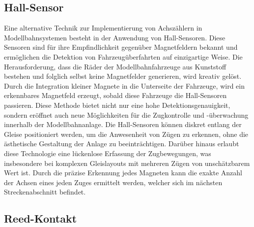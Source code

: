 \subsection{Hall-Sensor}\label{text:Methodik:Achszähler:Hall-Sensor}

Eine alternative Technik zur Implementierung von Achszählern in Modellbahnsystemen besteht in der Anwendung von Hall-Sensoren. Diese Sensoren sind für ihre Empfindlichkeit gegenüber Magnetfeldern bekannt und ermöglichen die Detektion von Fahrzeugüberfahrten auf einzigartige Weise. Die Herausforderung, dass die Räder der Modellbahnfahrzeuge aus Kunststoff bestehen und folglich selbst keine Magnetfelder generieren, wird kreativ gelöst. Durch die Integration kleiner Magnete in die Unterseite der Fahrzeuge, wird ein erkennbares Magnetfeld erzeugt, sobald diese Fahrzeuge die Hall-Sensoren passieren.
\newline
Diese Methode bietet nicht nur eine hohe Detektionsgenauigkeit, sondern eröffnet auch neue Möglichkeiten für die Zugkontrolle und -überwachung innerhalb der Modellbahnanlage. Die Hall-Sensoren können diskret entlang der Gleise positioniert werden, um die Anwesenheit von Zügen zu erkennen, ohne die ästhetische Gestaltung der Anlage zu beeinträchtigen. Darüber hinaus erlaubt diese Technologie eine lückenlose Erfassung der Zugbewegungen, was insbesondere bei komplexen Gleislayouts mit mehreren Zügen von unschätzbarem Wert ist. Durch die präzise Erkennung jedes Magneten kann die exakte Anzahl der Achsen eines jeden Zuges ermittelt werden, welcher sich im nächsten Streckenabschnitt befindet.

\subsection{Reed-Kontakt}\label{text:Methodik:Achszähler:Reed-Kontakt}

